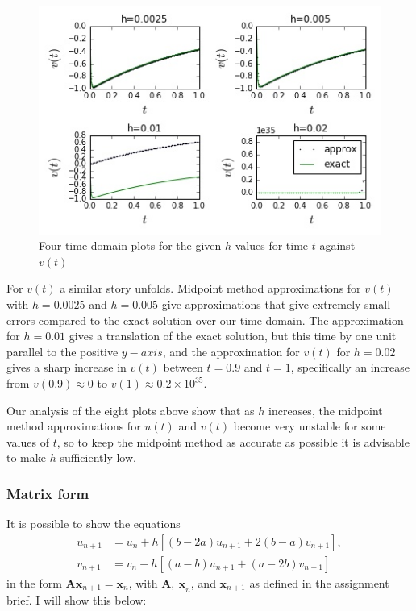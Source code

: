 \documentclass[11pt,a4paper]{article}
\begin{document}
\begin{figure}[h]
\caption{Four time-domain plots for the given $h$ values for time $t$ against $v(t)$}
\includegraphics[scale=0.55]{t_vt_sub.jpg}
\centering
\end{figure}

For $v(t)$ a similar story unfolds. Midpoint method approximations for $v(t)$ with $h=0.0025$ and $h=0.005$ give approximations that give extremely small errors compared to the exact solution over our time-domain. The approximation for $h=0.01$ gives a translation of the exact solution, but this time by one unit parallel to the positive $y-axis$, and the approximation for $v(t)$ for $h=0.02$ gives a sharp increase in $v(t)$ between $t=0.9$ and $t=1$, specifically an increase from $v(0.9)\approx 0$ to $v(1)\approx 0.2\times 10^{35}.$

Our analysis of the eight plots above show that as $h$ increases, the midpoint method approximations for $u(t)$ and $v(t)$ become very unstable for some values of $t$, so to keep the midpoint method as accurate as possible it is advisable to make $h$ sufficiently low.

\subsubsection*{Matrix form}
It is possible to show the equations
\begin{align*}
u_{n+1}&=u_n+h[(b-2a)u_{n+1}+2(b-a)v_{n+1}],\\
v_{n+1}&=v_{n}+h[(a-b)u_{n+1} +(a-2b)v_{n+1}]
\end{align*}
in the form $\boldsymbol{Ax}_{n+1}=\boldsymbol{x}_n$, with $\boldsymbol{A,\ x}_n$, and $\boldsymbol{x}_{n+1}$ as defined in the assignment brief. I will show this below: 
\end{document}
